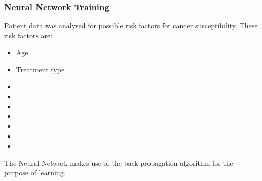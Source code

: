 	\subsubsection{Neural Network Training}
	Patient data was analysed for possible risk factors for cancer susceptibility. These risk factors are:
	\begin{itemize} %
		\item Age
		\item Treatment type
		\item 
		\item
		\item
		\item
		\item
		\item
		\item
	\end{itemize}
	
	The Neural Network makes use of the back-propagation algorithm for the purpose of learning.

